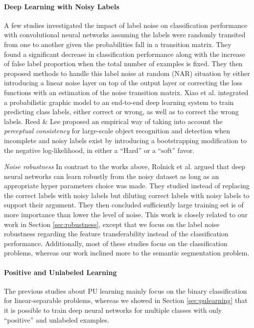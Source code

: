 \paragraph{{Deep Learning with Noisy Labels}}
A few studies\cite{sukhbaatar2014training,patrini2016making} investigated the impact of label noise on classification performance with convolutional neural networks assuming the labels were randomly transited from one to another given the probabilities fall in a transition matrix.
They found a significant decrease in classification performance along with the increase of false label proportion when the total number of examples is fixed.
They then proposed methods to handle this label noise at random (NAR)\cite{frenay2014classification} situation by either introducing a linear noise layer on top of the output layer\cite{sukhbaatar2014training} or correcting the loss functions with an estimation of the noise transition matrix\cite{patrini2016making}.
Xiao et al.\cite{xiao2015learning} integrated a probabilistic graphic model to an end-to-end deep learning system to train predicting class labels, either correct or wrong, as well as to correct the wrong labels.
Reed \& Lee\cite{reed2014training} proposed an empirical way of taking into account the \textit{perceptual consistency} for large-scale object recognition and detection when incomplete and noisy labels exist by introducing a bootstrapping modification to the negative log-likelihood, in either a ``Hard'' or a ``soft'' favor.

\textit{Noise robustness}
In contrast to the works above, Rolnick et al.\cite{rolnick2017deep} argued that deep neural networks can learn robustly from the noisy dataset as long as an appropriate hyper parameters choice was made.
They studied instead of replacing the correct labels with noisy labels but diluting correct labels with noisy labels to support their argument.
They then concluded sufficiently large training set is of more importance than lower the level of noise.
This work is closely related to our work in Section \ref{sec:robustness}, except that we focus on the label noise robustness regarding the feature transferability instead of the classification performance.
Additionally, most of these studies focus on the classification problems, whereas our work inclined more to the semantic segmentation problem.

\paragraph{Positive and Unlabeled Learning}
The previous studies about PU learning mainly focus on the binary classification for linear-separable problems\cite{elkan2008learning,lee2003learning}, whereas we showed in Section \ref{sec:pulearning} that it is possible to train deep neural networks for multiple classes with only ``positive'' and unlabeled examples.
